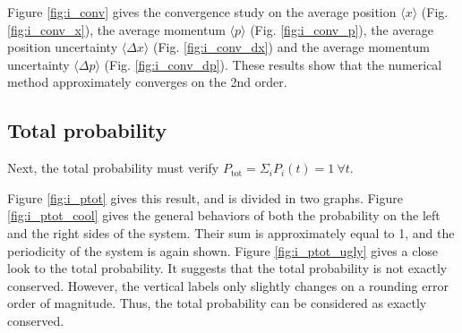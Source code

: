 \documentclass[a4paper,12pt,twoside]{article}
\begin{document}
    Figure \ref{fig:i_conv} gives the convergence study on the average position $\langle x \rangle$ (Fig. \ref{fig:i_conv_x}), the average momentum $\langle p \rangle$ (Fig. \ref{fig:i_conv_p}), the average position uncertainty $\langle \Delta x \rangle$ (Fig. \ref{fig:i_conv_dx}) and the average momentum uncertainty $\langle \Delta p \rangle$ (Fig. \ref{fig:i_conv_dp}).
    These results show that the numerical method approximately converges on the 2nd order.


  \subsection{Total probability}
    Next, the total probability must verify $P_\text{tot} = \Sigma_i P_i(t) = 1~\forall t$.

    Figure \ref{fig:i_ptot} gives this result, and is divided in two graphs.
    Figure \ref{fig:i_ptot_cool} gives the general behaviors of both the probability on the left and the right sides of the system.
    Their sum is approximately equal to 1, and the periodicity of the system is again shown.
    Figure \ref{fig:i_ptot_ugly} gives a close look to the total probability.
    It suggests that the total probability is not exactly conserved.
    However, the vertical labels only slightly changes on a rounding error order of magnitude.
    Thus, the total probability can be considered as exactly conserved.
\end{document}
